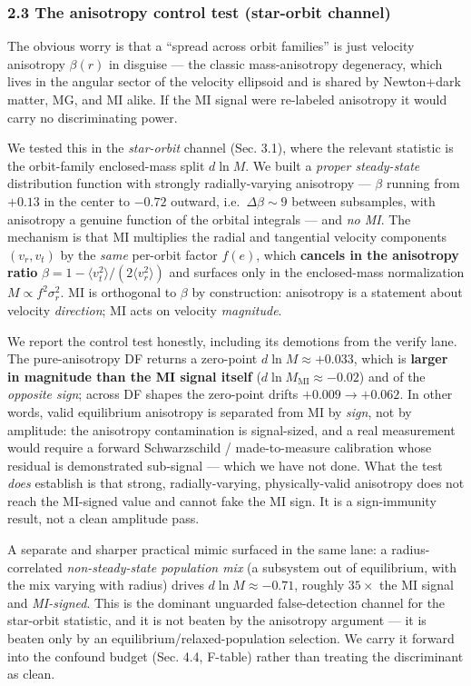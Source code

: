 \documentclass[
]{article}
\begin{document}
\subsubsection{2.3 The anisotropy control test (star-orbit
channel)}\label{the-anisotropy-control-test-star-orbit-channel}

The obvious worry is that a ``spread across orbit families'' is just
velocity anisotropy \(\beta(r)\) in disguise --- the classic
mass-anisotropy degeneracy, which lives in the angular sector of the
velocity ellipsoid and is shared by Newton+dark matter, MG, and MI
alike. If the MI signal were re-labeled anisotropy it would carry no
discriminating power.

We tested this in the \emph{star-orbit} channel (Sec. 3.1), where the
relevant statistic is the orbit-family enclosed-mass split \(d\ln M\).
We built a \emph{proper steady-state} distribution function with
strongly radially-varying anisotropy --- \(\beta\) running from
\(+0.13\) in the center to \(-0.72\) outward, i.e.~\(\Delta\beta\sim9\)
between subsamples, with anisotropy a genuine function of the orbital
integrals --- and \emph{no MI}. The mechanism is that MI multiplies the
radial and tangential velocity components \((v_r,v_t)\) by the
\emph{same} per-orbit factor \(f(e)\), which \textbf{cancels in the
anisotropy ratio}
\(\beta=1-\langle v_t^2\rangle/(2\langle v_r^2\rangle)\) and surfaces
only in the enclosed-mass normalization \(M\propto f^2\sigma_r^2\). MI
is orthogonal to \(\beta\) by construction: anisotropy is a statement
about velocity \emph{direction}; MI acts on velocity \emph{magnitude}.

We report the control test honestly, including its demotions from the
verify lane. The pure-anisotropy DF returns a zero-point
\(d\ln M\approx+0.033\), which is \textbf{larger in magnitude than the
MI signal itself} (\(d\ln M_\mathrm{MI}\approx-0.02\)) and of the
\emph{opposite sign}; across DF shapes the zero-point drifts
\(+0.009\to+0.062\). In other words, valid equilibrium anisotropy is
separated from MI by \emph{sign}, not by amplitude: the anisotropy
contamination is signal-sized, and a real measurement would require a
forward Schwarzschild / made-to-measure calibration whose residual is
demonstrated sub-signal --- which we have not done. What the test
\emph{does} establish is that strong, radially-varying, physically-valid
anisotropy does not reach the MI-signed value and cannot fake the MI
sign. It is a sign-immunity result, not a clean amplitude pass.

A separate and sharper practical mimic surfaced in the same lane: a
radius-correlated \emph{non-steady-state population mix} (a subsystem
out of equilibrium, with the mix varying with radius) drives
\(d\ln M\approx-0.71\), roughly \(35\times\) the MI signal and
\emph{MI-signed}. This is the dominant unguarded false-detection channel
for the star-orbit statistic, and it is not beaten by the anisotropy
argument --- it is beaten only by an equilibrium/relaxed-population
selection. We carry it forward into the confound budget (Sec. 4.4,
F-table) rather than treating the discriminant as clean.
\end{document}
